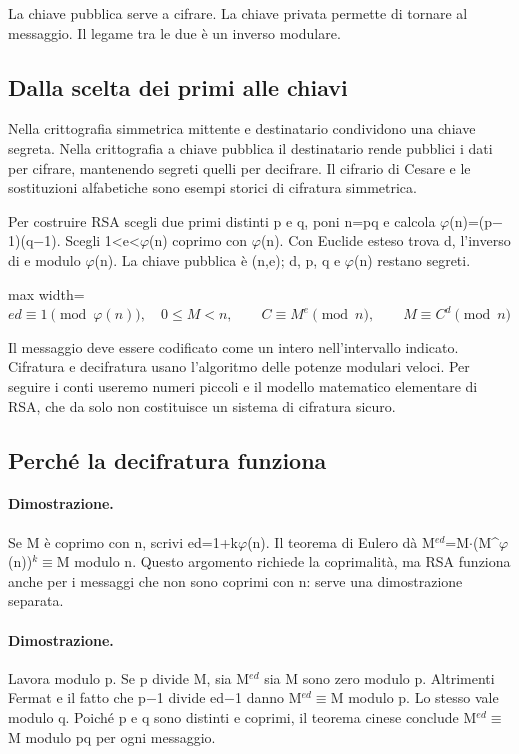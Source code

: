 \documentclass[a4paper,11pt]{article}
\begin{document}
La chiave pubblica serve a cifrare. La chiave privata permette di tornare al messaggio. Il legame tra le due è un inverso modulare.

\subsection{Dalla scelta dei primi alle chiavi}

Nella crittografia simmetrica mittente e destinatario condividono una chiave segreta. Nella crittografia a chiave pubblica il destinatario rende pubblici i dati per cifrare, mantenendo segreti quelli per decifrare. Il cifrario di Cesare e le sostituzioni alfabetiche sono esempi storici di cifratura simmetrica.

Per costruire RSA scegli due primi distinti p e q, poni n=pq e calcola $\varphi$(n)=(p$-$1)(q$-$1). Scegli 1<e<$\varphi$(n) coprimo con $\varphi$(n). Con Euclide esteso trova d, l’inverso di e modulo $\varphi$(n). La chiave pubblica è (n,e); d, p, q e $\varphi$(n) restano segreti.

\begin{center}\begin{adjustbox}{max width=\linewidth}$\displaystyle ed\equiv1\pmod{\varphi(n)},\quad0\le M<n,\qquad C\equiv M^e\pmod n,\qquad M\equiv C^d\pmod n$\end{adjustbox}\end{center}

Il messaggio deve essere codificato come un intero nell’intervallo indicato. Cifratura e decifratura usano l’algoritmo delle potenze modulari veloci. Per seguire i conti useremo numeri piccoli e il modello matematico elementare di RSA, che da solo non costituisce un sistema di cifratura sicuro.

\subsection{Perché la decifratura funziona}

\paragraph{Dimostrazione.} Se M è coprimo con n, scrivi ed=1+k$\varphi$(n). Il teorema di Eulero dà M$^{ed}$=M$\cdot$(M\textasciicircum{}$\varphi$(n))$^{k}$$\equiv$M modulo n. Questo argomento richiede la coprimalità, ma RSA funziona anche per i messaggi che non sono coprimi con n: serve una dimostrazione separata.

\paragraph{Dimostrazione.} Lavora modulo p. Se p divide M, sia M$^{ed}$ sia M sono zero modulo p. Altrimenti Fermat e il fatto che p$-$1 divide ed$-$1 danno M$^{ed}$$\equiv$M modulo p. Lo stesso vale modulo q. Poiché p e q sono distinti e coprimi, il teorema cinese conclude M$^{ed}$$\equiv$M modulo pq per ogni messaggio.
\end{document}
